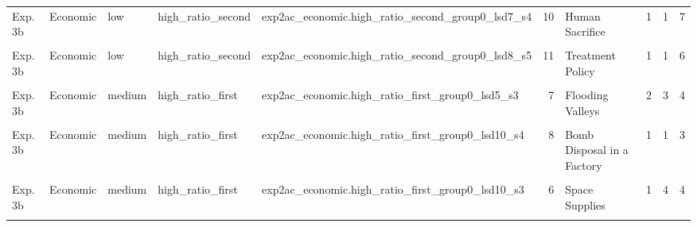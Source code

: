 \documentclass[
]{article}
\begin{document}
\begin{longtable}[t]{lllllrlrrr}
Exp. 3b & Economic & low & high\_ratio\_second & exp2ac\_economic.high\_ratio\_second\_group0\_lsd7\_s4 & 10 & Human Sacrifice & 1 & 1 & 7\\
\addlinespace
\cellcolor{gray!10}{Exp. 3b} & \cellcolor{gray!10}{Economic} & \cellcolor{gray!10}{low} & \cellcolor{gray!10}{high\_ratio\_second} & \cellcolor{gray!10}{exp2ac\_economic.high\_ratio\_second\_group0\_lsd8\_s1} & \cellcolor{gray!10}{6} & \cellcolor{gray!10}{Space Supplies} & \cellcolor{gray!10}{1} & \cellcolor{gray!10}{2} & \cellcolor{gray!10}{5}\\
Exp. 3b & Economic & low & high\_ratio\_second & exp2ac\_economic.high\_ratio\_second\_group0\_lsd8\_s5 & 11 & Treatment Policy & 1 & 1 & 6\\
\cellcolor{gray!10}{Exp. 3b} & \cellcolor{gray!10}{Economic} & \cellcolor{gray!10}{medium} & \cellcolor{gray!10}{high\_ratio\_first} & \cellcolor{gray!10}{exp2ac\_economic.high\_ratio\_first\_group0\_lsd1\_s2} & \cellcolor{gray!10}{7} & \cellcolor{gray!10}{Flooding Valleys} & \cellcolor{gray!10}{2} & \cellcolor{gray!10}{3} & \cellcolor{gray!10}{6}\\
Exp. 3b & Economic & medium & high\_ratio\_first & exp2ac\_economic.high\_ratio\_first\_group0\_lsd5\_s3 & 7 & Flooding Valleys & 2 & 3 & 4\\
\cellcolor{gray!10}{Exp. 3b} & \cellcolor{gray!10}{Economic} & \cellcolor{gray!10}{medium} & \cellcolor{gray!10}{high\_ratio\_first} & \cellcolor{gray!10}{exp2ac\_economic.high\_ratio\_first\_group0\_lsd6\_s4} & \cellcolor{gray!10}{4} & \cellcolor{gray!10}{Blitz} & \cellcolor{gray!10}{1} & \cellcolor{gray!10}{4} & \cellcolor{gray!10}{3}\\
\addlinespace
Exp. 3b & Economic & medium & high\_ratio\_first & exp2ac\_economic.high\_ratio\_first\_group0\_lsd10\_s4 & 8 & Bomb Disposal in a Factory & 1 & 1 & 3\\
\cellcolor{gray!10}{Exp. 3b} & \cellcolor{gray!10}{Economic} & \cellcolor{gray!10}{medium} & \cellcolor{gray!10}{high\_ratio\_first} & \cellcolor{gray!10}{exp2ac\_economic.high\_ratio\_first\_group0\_lsd8\_s4} & \cellcolor{gray!10}{10} & \cellcolor{gray!10}{Human Sacrifice} & \cellcolor{gray!10}{1} & \cellcolor{gray!10}{1} & \cellcolor{gray!10}{7}\\
Exp. 3b & Economic & medium & high\_ratio\_first & exp2ac\_economic.high\_ratio\_first\_group0\_lsd10\_s3 & 6 & Space Supplies & 1 & 4 & 4\\
\cellcolor{gray!10}{Exp. 3b} & \cellcolor{gray!10}{Economic} & \cellcolor{gray!10}{medium} & \cellcolor{gray!10}{high\_ratio\_second} & \cellcolor{gray!10}{exp2ac\_economic.high\_ratio\_second\_group0\_lsd8\_s2} & \cellcolor{gray!10}{4} & \cellcolor{gray!10}{Blitz} & \cellcolor{gray!10}{1} & \cellcolor{gray!10}{3} & \cellcolor{gray!10}{1}\\

\end{longtable}
\end{document}
